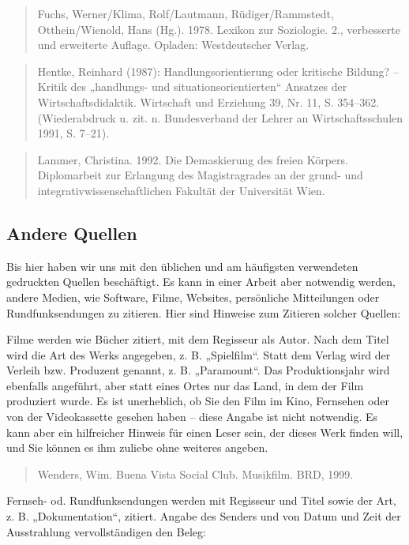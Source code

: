 \documentclass[]{book}
\theoremstyle{definition}
\theoremstyle{definition}
\theoremstyle{definition}
\theoremstyle{remark}
\begin{document}
\begin{quote}
Fuchs, Werner/Klima, Rolf/Lautmann, Rüdiger/Rammstedt, Otthein/Wienold,
Hans (Hg.). 1978. Lexikon zur Soziologie. 2., verbesserte und erweiterte
Auflage. Opladen: Westdeutscher Verlag.
\end{quote}

\begin{quote}
Hentke, Reinhard (1987): Handlungsorientierung oder kritische Bildung?
-- Kritik des „handlungs- und situationsorientierten`` Ansatzes der
Wirtschaftsdidaktik. Wirtschaft und Erziehung 39, Nr. 11, S. 354--362.
(Wiederabdruck u. zit. n. Bundesverband der Lehrer an Wirtschaftsschulen
1991, S. 7--21).
\end{quote}

\begin{quote}
Lammer, Christina. 1992. Die Demaskierung des freien Körpers.
Diplomarbeit zur Erlangung des Magistragrades an der grund- und
integrativwissenschaftlichen Fakultät der Universität Wien.
\end{quote}

\subsection{Andere Quellen}\label{andere-quellen}

Bis hier haben wir uns mit den üblichen und am häufigsten verwendeten
gedruckten Quellen beschäftigt. Es kann in einer Arbeit aber notwendig
werden, andere Medien, wie Software, Filme, Websites, persönliche
Mitteilungen oder Rundfunksendungen zu zitieren. Hier sind Hinweise zum
Zitieren solcher Quellen:

Filme werden wie Bücher zitiert, mit dem Regisseur als Autor. Nach dem
Titel wird die Art des Werks angegeben, z. B. „Spielfilm``. Statt dem
Verlag wird der Verleih bzw. Produzent genannt, z. B. „Paramount``. Das
Produktionsjahr wird ebenfalls angeführt, aber statt eines Ortes nur das
Land, in dem der Film produziert wurde. Es ist unerheblich, ob Sie den
Film im Kino, Fernsehen oder von der Videokassette gesehen haben --
diese Angabe ist nicht notwendig. Es kann aber ein hilfreicher Hinweis
für einen Leser sein, der dieses Werk finden will, und Sie können es ihm
zuliebe ohne weiteres angeben.

\begin{quote}
Wenders, Wim. Buena Vista Social Club. Musikfilm. BRD, 1999.
\end{quote}

Fernseh- od. Rundfunksendungen werden mit Regisseur und Titel sowie der
Art, z. B. „Dokumentation``, zitiert. Angabe des Senders und von Datum
und Zeit der Ausstrahlung vervollständigen den Beleg:
\end{document}
